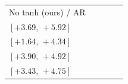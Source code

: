 \begin{table}[t]
\begin{tabular}{@{}lrrrr@{}}
No tanh (ours) / AR & \shortstack[r]{$\textcolor{gainpositive}{\mathbf{+4.78}}$\\$[+3.69,\,+5.92]$} & \shortstack[r]{$\textcolor{gainpositive}{\mathbf{+3.10}}$\\$[+1.64,\,+4.34]$} & \shortstack[r]{$\textcolor{gainpositive}{\mathbf{+4.40}}$\\$[+3.90,\,+4.92]$} & \shortstack[r]{$\textcolor{gainpositive}{\mathbf{+4.09}}$\\$[+3.43,\,+4.75]$} \\[3pt]
\bottomrule\end{tabular}\endgroup\end{table}
